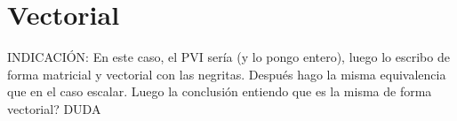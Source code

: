 \section{Vectorial}
INDICACIÓN:
En este caso, el PVI sería (y lo pongo entero), luego lo escribo de forma matricial y vectorial con las negritas. Después hago la misma equivalencia que en el caso escalar. Luego la conclusión entiendo que es la misma de forma vectorial? DUDA
\endinput
-